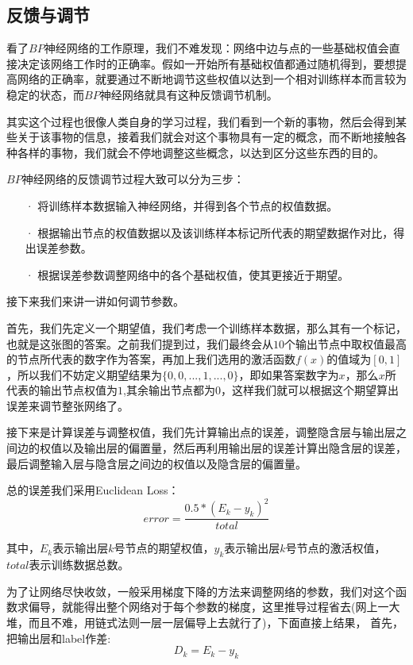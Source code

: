 ﻿\documentclass[UTF8]{ctexart}
\begin{document}
    \subsection{反馈与调节}
看了$BP$神经网络的工作原理，我们不难发现：网络中边与点的一些基础权值会直接决定该网络工作时的正确率。假如一开始所有基础权值都通过随机得到，要想提高网络的正确率，就要通过不断地调节这些权值以达到一个相对训练样本而言较为稳定的状态，而$BP$神经网络就具有这种反馈调节机制。\par
其实这个过程也很像人类自身的学习过程，我们看到一个新的事物，然后会得到某些关于该事物的信息，接着我们就会对这个事物具有一定的概念，而不断地接触各种各样的事物，我们就会不停地调整这些概念，以达到区分这些东西的目的。\par
$BP$神经网络的反馈调节过程大致可以分为三步：
\begin{enumerate}
\item[·]将训练样本数据输入神经网络，并得到各个节点的权值数据。
\item[·]根据输出节点的权值数据以及该训练样本标记所代表的期望数据作对比，得出误差参数。
\item[·]根据误差参数调整网络中的各个基础权值，使其更接近于期望。
\end{enumerate} \par
接下来我们来讲一讲如何调节参数。\par
首先，我们先定义一个期望值，我们考虑一个训练样本数据，那么其有一个标记，也就是这张图的答案。之前我们提到过，我们最终会从$10$个输出节点中取权值最高的节点所代表的数字作为答案，再加上我们选用的激活函数$f(x)$的值域为$[0,1]$，所以我们不妨定义期望结果为$\{0,0,...,1,...,0\}$，即如果答案数字为$x$，那么$x$所代表的输出节点权值为$1$,其余输出节点都为$0$，这样我们就可以根据这个期望算出误差来调节整张网络了。\par
接下来是计算误差与调整权值，我们先计算输出点的误差，调整隐含层与输出层之间边的权值以及输出层的偏置量，然后再利用输出层的误差计算出隐含层的误差，最后调整输入层与隐含层之间边的权值以及隐含层的偏置量。\par
总的误差我们采用Euclidean Loss：
$$error = \frac{0.5 * (E_k - y_k)^2}{total}$$ \par
其中，$E_k$表示输出层$k$号节点的期望权值，$y_k$表示输出层$k$号节点的激活权值，$total$表示训练数据总数。 \par
为了让网络尽快收敛，一般采用梯度下降的方法来调整网络的参数，我们对这个函数求偏导，就能得出整个网络对于每个参数的梯度，这里推导过程省去(网上一大堆，而且不难，用链式法则一层一层偏导上去就行了)，下面直接上结果，
首先，把输出层和label作差:
$$D_k = E_k - y_k$$ \par
\end{document}
